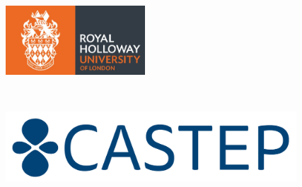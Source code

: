 \documentclass[article]{revtex4}
\begin{document}
\begin{titlepage}
\begin{center}
\vspace*{\fill}

\begin{minipage}{0.35\textwidth}
\begin{flushleft}
\includegraphics[height=2.6cm]{rhul_logo.jpg}
\end{flushleft}
\end{minipage}
~
\begin{minipage}{0.63\textwidth}
\begin{flushright}
\includegraphics[height=2.6cm]{castep_logo.png}
\end{flushright}
\end{minipage}

\end{center}
\end{titlepage}


\tableofcontents

\newpage




\newpage



\end{document}
